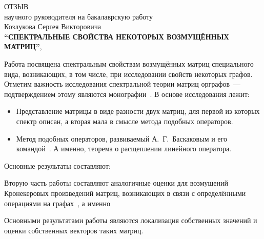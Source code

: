 \begin{center}
  ОТЗЫВ\\
  научного руководителя на бакалаврскую работу\\
  Козлукова Сергея Викторовича\\
  \textbf{``СПЕК\-ТРАЛЬНЫЕ СВОЙ\-СТВА НЕКОТОРЫХ ВОЗМУЩ\-ЁННЫХ МАТРИЦ''},
\end{center}

Работа посвящена спектральным свойствам возмущённых матриц
специального вида, возникающих, в том числе, при исследовании свойств некоторых
графов. Отметим важность исследования спектральной теории матриц орграфов~---%
подтверждением этому являются монографии~\cite{cvetkovic1997eigenspaces,cvetkovic1980spectra,godsil2013algebraic}.
В основе исследования лежит:
\begin{itemize}
  \item Представление матрицы в виде разности двух матриц, для первой из которых
    спектр описан, а вторая мала в смысле метода подобных операторов.
    \item Метод подобных операторов, развиваемый А.~Г.~Баскаковым и его
      командой~\cite{baskakov1986theorem,baskakov1994spectral,baskakov2002splitting}.
      А именно, теорема о расщеплении линейного
      оператора.
\end{itemize}

Основные результаты составляют:

\begin{thm*}
  
\end{thm*}

\begin{thm*}
  
\end{thm*}
    
Вторую часть работы составляют аналогичные оценки для возмущений Кронекеровых
произведений матриц, возникающих в связи с определёнными операциями на
графах~\cite{bellman-matrices-kron,XIANG2005210}, а именно

\begin{thm*}
  
\end{thm*}
  

Основными результатами работы являются локализация собственных значений и оценки
собственных векторов таких матриц.

